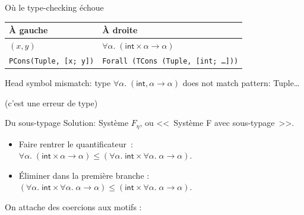 \documentclass[final]{beamer}
\newcommand{\red}[1]{\textcolor[HTML]{F7800A}{#1}}
\begin{document}
\begin{frame}{Où le type-checking échoue}

\begin{tabular}{l|l}
  À gauche & À droite\\
\hline
$(x, y)$ & $\forall \alpha.\; (\mathsf{int} \times \alpha \to \alpha)$ \\
\texttt{PCons(Tuple, [x; y])} &
\texttt{Forall (TCons (Tuple, [int; …]))}
\end{tabular}

\vspace{2ex}

\red{Head symbol mismatch: type $\forall \alpha.\;
(\mathsf{int}, \alpha \to \alpha)$ does not match pattern: Tuple…}

\begin{flushright}
  (c'est une erreur de type)
\end{flushright}

\end{frame}


\begin{frame}{Du sous-typage}
  Solution: Système $F_\eta$, ou <<~Système F avec sous-typage~>>.

  \begin{itemize}
    \item Faire rentrer le quantificateur~:
      $\forall \alpha.\; (\mathsf{int}\times \alpha\to\alpha) \leq (\forall \alpha.\; \mathsf{int}\times \forall \alpha.\; \alpha\to\alpha)$.
    \item Éliminer dans la première branche :
      $(\forall \alpha.\; \mathsf{int}\times \forall \alpha.\; \alpha\to\alpha) \leq
      (\mathsf{int}\times \forall \alpha.\; \alpha\to\alpha)$.
  \end{itemize}

  On attache des coercions aux motifs :
  \begin{center}
  \end{center}
\end{frame}
\end{document}
